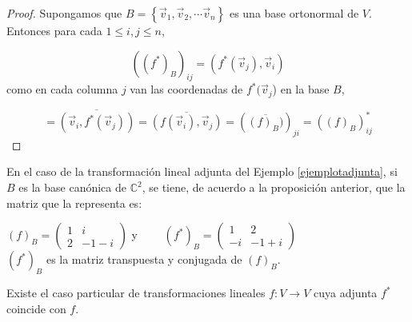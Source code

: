 {\begin{theorem}
\bigskip

\begin{proof}

Supongamos que $B=\left\{\vec{v}_1,\vec{v}_2, \cdots\vec{v}_n\right\}$ es  una base ortonormal de $V$. Entonces para cada $1 \le i, j \le n$, 

$$((f^{*})_B)_{ij}= (f^{*}(\vec{v}_j), \vec{v}_i)$$
\noindent
como  en cada columna $j$ van las coordenadas de $f^{*}(\vec{v}_j$) en la base $B$,

$$=\overline{(\vec{v}_i, f^{*}(\vec{v}_j))}= \overline{(f(\vec{v}_i), \vec{v}_j)}= (\overline{( f )_B)})_{ji}= (( f )_B)^{*}_{ij} $$

\end{proof}

\end{theorem}

\bigskip

\bigskip

\begin{example}
En el caso de la transformación lineal adjunta del Ejemplo \ref{ejemplotadjunta}, si $B$ es la base canónica de $\mathbb{C}^{2}$, se tiene, de acuerdo a la proposición anterior, que la matriz que la representa es:

\bigskip

$(f)_B= \left(\begin{array}{cc}  1 & i  \\ 2 &  -1-i 
\end{array}
 \right)$  y   $ \qquad (f ^{*})_B= \left(\begin{array}{cc}  1 & 2  \\ -i &  -1+i 
\end{array}
 \right)$ \\
 
\noindent 
$(f ^{*})_B$ es la matriz transpuesta y conjugada de $(f)_B$.

  
\bigskip 


\end{example}



\bigskip


Existe el caso particular de transformaciones lineales $f: V \rightarrow V$ cuya adjunta $f ^{*}$ coincide con $f$.

\bigskip

\begin{definition} 


\end{definition}}
